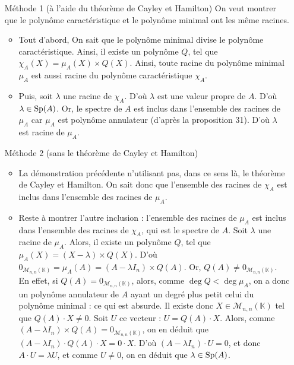 \begin{prv}
	\begin{itemize}
		\item[\sc Méthode 1] (à l'aide du théorème de {\sc Cayley}\/ et {\sc Hamilton})
			On veut montrer que le polynôme caractéristique et le polynôme minimal ont les même racines.

			\begin{itemize}
				\item Tout d'abord, On sait que le polynôme minimal divise le polynôme caractéristique. Ainsi, il existe un polynôme $Q$, tel que $\chi_A(X) = \mu_A(X)\times Q(X)$. Ainsi, toute racine du polynôme minimal $\mu_A$\/ est aussi racine du polynôme caractéristique $\chi_A$.

				\item Puis, soit $\lambda$\/ une racine de $\chi_A$.
					D'où $\lambda$\/ est une valeur propre de $A$.
					D'où $\lambda \in \operatorname{Sp}(A)$.
					Or, le spectre de $A$\/ est inclus dans l'ensemble des racines de $\mu_A$\/ car $\mu_A$\/ est polynôme annulateur (d'après la proposition 31).
					D'où $\lambda$\/ est racine de $\mu_A$.
			\end{itemize}
		\item[\sc Méthode 2] (sans le théorème de {\sc Cayley}\/ et {\sc Hamilton})
			\begin{itemize}
				\item La démonstration précédente n'utilisant pas, dans ce sens là, le théorème de {\sc Cayley}\/ et {\sc Hamilton}. On sait donc que l'ensemble des racines de $\chi_A$\/ est inclus dans l'ensemble des racines de $\mu_A$.
				\item Reste à montrer l'autre inclusion : l'ensemble des racines de $\mu_A$\/ est inclus dans l'ensemble des racines de $\chi_A$, qui est le spectre de $A$. Soit $\lambda$\/ une racine de $\mu_A$.
					Alors, il existe un polynôme $Q$, tel que $\mu_A(X) = (X - \lambda) \times Q(X)$.
					D'où $0_{\mathscr{M}_{n,n}(\mathds{K})} = \mu_A(A) = (A - \lambda I_n) \times Q(A)$.
					Or, $Q(A) \neq 0_{\mathscr{M}_{n,n}(\mathds{K})}$. En effet, si $Q(A) = 0_{\mathscr{M}_{n,n}(\mathds{K})}$, alors, comme $\deg Q < \deg \mu_A$, on a donc un polynôme annulateur de $A$\/ ayant un degré plus petit celui du polynôme minimal : ce qui est absurde.
					Il existe donc $X \in \mathscr{M}_{n,n}(\mathds{K})$\/ tel que $Q(A)\cdot X \neq 0$. Soit $U$\/ ce vecteur : $U = Q(A) \cdot X$. Alors, comme $(A-\lambda I_n) \times Q(A) = 0_{\mathscr{M}_{n,n}(\mathds{K})}$, on en déduit que $(A-\lambda I_n) \cdot Q(A) \cdot X = 0 \cdot X$. D'où $(A - \lambda I_n) \cdot U = 0$, et donc $A\cdot U = \lambda U$, et comme $U \neq 0$, on en déduit que $\lambda \in \operatorname{Sp}(A)$.
			\end{itemize}
	\end{itemize}
\end{prv}


